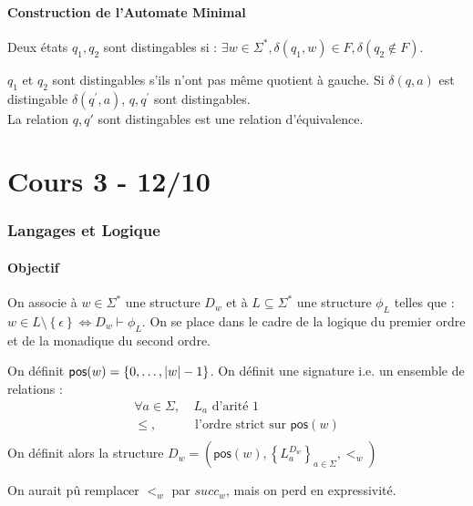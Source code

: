 \documentclass{cours}
\begin{document}
\subsection{Construction de l'Automate Minimal}
\begin{definition}
    Deux états $q_{1}, q_{2}$ sont distingables si : $\exists w \in \Sigma^{*}, \delta(q_{1}, w) \in F, \delta(q_{2} \notin F)$. 
\end{definition}
\begin{proposition}
    $q_{1}$ et $q_{2}$ sont distingables s'ils n'ont pas même quotient à gauche. Si $\delta(q, a)$ est distingable $\delta(q^{'}, a)$, $q, q^{'}$ sont distingables.\\
    La relation $q, q'$ sont distingables est une relation d'équivalence. 
\end{proposition}

\part{Cours 3 - 12/10}
\section{Langages et Logique}
\subsection{Objectif}
On associe à $w \in \Sigma^{*}$ une structure $D_{w}$ et à $L \subseteq \Sigma^{*}$ une structure $\phi_{L}$ telles que : $w \in L\setminus \left\{\epsilon\right\} \Leftrightarrow D_{w} \vdash \phi_{L}$. On se place dans le cadre de la logique du premier ordre et de la monadique du second ordre.\\

\begin{definition}
    On définit $\textsf{pos}(w) = \left\{0, \ldots, \left|w\right| - 1\right\}$. On définit une signature i.e. un ensemble de relations : 
\[
    \begin{aligned}
        \forall a \in \Sigma,& \ L_{a} \text{ d'arité } 1\\
        \leq, & \text{ l'ordre strict sur } \textsf{pos}(w)\\
    \end{aligned}   
\]    
On définit alors la structure $D_{w} = \left(\textsf{pos}(w), \left\{L_{a}^{D_{w}}\right\}_{a \in \Sigma}, <_{w}\right)$
\end{definition}
\begin{remark}
    On aurait pû remplacer $<_{w}$ par $succ_{w}$, mais on perd en expressivité. 
\end{remark}
\end{document}
